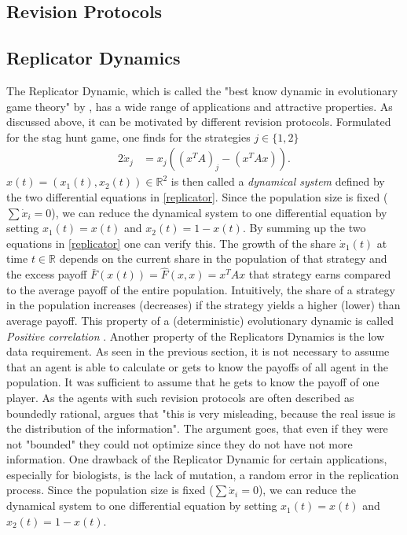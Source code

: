 \documentclass[11pt]{article}
\newcommand{\realnumb}{\mathbb{R}}
\begin{document}
\subsection{Revision Protocols}


\subsection{Replicator Dynamics}
The Replicator Dynamic, which is called the "best know dynamic in
evolutionary game theory" by \cite{sandholm_populaton_2010}, has a wide range of applications
and attractive properties. As discussed above, it can be motivated by 
different revision protocols. Formulated for the stag hunt game, one finds for
the strategies $j \in \{1,2\}$
\begin{alignat}{2}
        \dot{x}_j &= x_j\left(\left(x^T A\right)_j - \left(x^T A x\right)\right) 
        \label{eq:replicator}.
\end{alignat}
$x(t)=(x_1(t), x_2(t)) \in \realnumb^2$ is then called a \textit{dynamical
system} defined by the two differential equations in \eqref{replicator}. 
Since the population size is fixed ($\sum\dot{x}_i=0$), 
we can reduce the dynamical system to one differential equation by setting 
$x_1(t) = x(t)$ and $x_2(t) = 1-x(t)$.
By summing up the two equations in \eqref{replicator} one can verify this.
The growth of the share $\dot{x}_1(t)$ at time $t \in \realnumb$ depends on the current share in the
population of that strategy and the excess payoff $\bar{F}(x(t)) 
= \hat{F}(x,x) = x^T A x$ that strategy earns 
compared to the average payoff of the entire population. Intuitively, the
share of a strategy in the population increases (decreases) if the strategy
yields a higher (lower) than average payoff. This property of a (deterministic)
evolutionary dynamic is called \textit{Positive correlation} \cite{sandholm}.
Another property of the Replicators Dynamics is the low data requirement. As 
seen in the previous section, it is not necessary to assume that an agent
is able to calculate or gets to know the payoffs of all agent in the population.
It was sufficient to assume that he gets to know the payoff of one player. 
As the agents with such revision protocols are often described as boundedly
rational, \cite{gintis} argues that "this is very misleading, because the real 
issue is the distribution of the information". The argument goes, that even
if they were not "bounded" they could not optimize since they do not have
not more information. 
One drawback of the Replicator Dynamic for certain applications, especially
for biologists, is the lack of mutation, a random error in the replication 
process.
Since the population size is fixed ($\sum\dot{x}_i=0$), 
we can reduce the dynamical system to one differential equation by setting 
$x_1(t) = x(t)$ and $x_2(t) = 1-x(t)$.
\end{document}
